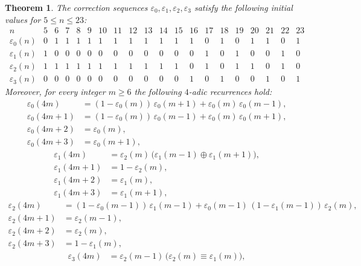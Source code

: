 \documentclass[12pt]{article}
\newtheorem{theorem}{Theorem}[section]
\theoremstyle{definition}
\theoremstyle{remark}
\begin{document}
\begin{theorem}\label{thm:r4eps}
The correction sequences $\varepsilon_0,\varepsilon_1,\varepsilon_2,\varepsilon_3$
satisfy the following initial values for $5\le n\le 23$:
\[
\begin{array}{c|ccccccccccccccccccc}
n & 5&6&7&8&9&10&11&12&13&14&15&16&17&18&19&20&21&22&23\\ \hline
\varepsilon_0(n)&0&1&1&1&1&1&1&1&1&1&1&1&0&1&0&1&1&0&1\\
\varepsilon_1(n)&1&0&0&0&0&0&0&0&0&0&0&0&1&0&1&0&0&1&0\\
\varepsilon_2(n)&1&1&1&1&1&1&1&1&1&1&1&0&1&0&1&1&0&1&0\\
\varepsilon_3(n)&0&0&0&0&0&0&0&0&0&0&0&1&0&1&0&0&1&0&1
\end{array}
\]
Moreover, for every integer $m\ge 6$ the following $4$-adic recurrences hold:
\begin{align}
\varepsilon_0(4m)   &= (1-\varepsilon_0(m))\,\varepsilon_0(m+1)+\varepsilon_0(m)\,\varepsilon_0(m-1), \label{eq:e0_0}\\
\varepsilon_0(4m+1) &= (1-\varepsilon_0(m))\,\varepsilon_0(m-1)+\varepsilon_0(m)\,\varepsilon_0(m+1), \label{eq:e0_1}\\
\varepsilon_0(4m+2) &= \varepsilon_0(m), \label{eq:e0_2}\\
\varepsilon_0(4m+3) &= \varepsilon_0(m+1), \label{eq:e0_3}
\end{align}
\begin{align}
\varepsilon_1(4m)   &= \varepsilon_2(m)\,\bigl(\varepsilon_1(m-1)\oplus \varepsilon_1(m+1)\bigr), \label{eq:e1_0}\\
\varepsilon_1(4m+1) &= 1-\varepsilon_2(m), \label{eq:e1_1}\\
\varepsilon_1(4m+2) &= \varepsilon_1(m), \label{eq:e1_2}\\
\varepsilon_1(4m+3) &= \varepsilon_1(m+1), \label{eq:e1_3}
\end{align}
\begin{align}
\varepsilon_2(4m)   &= (1-\varepsilon_0(m-1))\,\varepsilon_1(m-1)+\varepsilon_0(m-1)\,(1-\varepsilon_1(m-1))\,\varepsilon_2(m), \label{eq:e2_0}\\
\varepsilon_2(4m+1) &= \varepsilon_2(m-1), \label{eq:e2_1}\\
\varepsilon_2(4m+2) &= \varepsilon_2(m), \label{eq:e2_2}\\
\varepsilon_2(4m+3) &= 1-\varepsilon_1(m), \label{eq:e2_3}
\end{align}
\begin{align}
\varepsilon_3(4m)   &= \varepsilon_2(m-1)\,\bigl(\varepsilon_2(m)\equiv \varepsilon_1(m)\bigr), \label{eq:e3_0}\\

\end{align}
\end{theorem}
\end{document}
